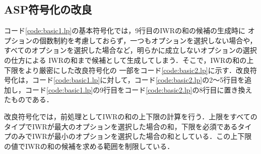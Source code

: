 \subsection{ASP符号化の改良}
 

コード\ref{code:basic1.lp}の基本符号化では，9行目のIWRの和の候補の生成時に
オプションの個数制約を考慮しておらず，一つもオプションを選択しない場合や，
すべてのオプションを選択した場合など，明らかに成立しないオプションの選択の仕方による
IWRの和まで候補として生成してしまう．そこで，IWRの和の上下限をより厳密にした改良符号化の
一部をコード\ref{code:basic2.lp}に示す．改良符号化は，コード\ref{code:basic1.lp}に対して，コード\ref{code:basic2.lp}の2〜5行目を追加し，コード\ref{code:basic1.lp}の9行目をコード\ref{code:basic2.lp}の8行目に置き換えたものである．

改良符号化では，前処理としてIWRの和の上下限の計算を行う．上限をすべてのタイプでIWRが最大のオプションを選択した場合の和，下限を必須であるタイプのみでIWRが最小のオプションを選択した場合の和としている．この上下限の値でIWRの和の候補を求める範囲を制限している．
